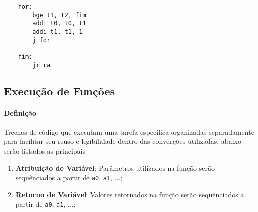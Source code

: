 \documentclass{article}
\begin{document}
\begin{enumerate}[rightmargin = \leftmargin]
\begin{minipage}[t]{0.45\linewidth}
\begin{scriptsize}
\begin{lstlisting}
    for:
        bge t1, t2, fim
        addi t0, t0, t1
        addi t1, t1, 1
        j for

    fim:
        jr ra
                            \end{lstlisting}
                        \end{scriptsize}
                    \end{minipage}
            \end{enumerate}

        \subsection{Execução de Funções}
            \paragraph{Definição}Trechos de código que executam uma tarefa específica organizadas separadamente para facilitar seu reuso e legibilidade dentro das convenções utilizadas, abaixo serão listados as principais:
                \begin{enumerate}[rightmargin = \leftmargin]
                    \item \textbf{Atribuição de Variável}: Parâmetros utilizados na função serão sequênciados a partir de \texttt{a0}, \texttt{a1}, ...;

                    \item \textbf{Retorno de Variável}: Valores retornados na função serão sequênciados a partir de \texttt{a0}, \texttt{a1}, ...; 
                \end{enumerate}
\end{document}
